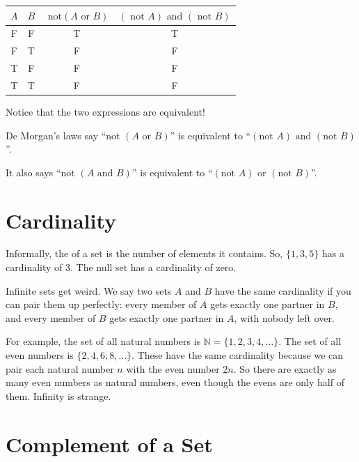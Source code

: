 \begin{Answer}[ref=logic_table]

\begin{tabular}{c | c | c | c}
  $A$ & $B$ & $\text{ not} \left(A \text{ or } B \right)$
  & $\left(\text{ not } A \right) \text{ and } \left(\text{ not } B \right)$ \\
  \hline
  F & F & T & T \\
  F & T & F & F \\
  T & F & F & F \\
  T & T & F & F \\
\end{tabular}

Notice that the two expressions are equivalent!

De Morgan's laws say ``$\text{not } \left(A \text{ or } B \right)$'' is
equivalent to ``$\left(\text{not } A \right) \text{ and } \left(\text{not } B
\right)$''.

It also says ``$\text{not } \left(A \text{ and } B \right)$'' is
equivalent to ``$\left(\text{not } A \right) \text{ or } \left(\text{not } B\right)$''.

\end{Answer}



\section{Cardinality}

Informally, the  of a set is the number of
elements it contains. So, $\{1,3,5\}$ has a cardinality of 3.  The
null set has a cardinality of zero.

Infinite sets get weird. We say two sets $A$ and $B$ have the same cardinality if you can pair them up perfectly: every member of $A$ gets exactly one partner in $B$, and every member of $B$ gets exactly one partner in $A$, with nobody left over.

For example, the set of all natural numbers is $\mathbb{N} = \{1,2,3,4,\dots\}$. The set of all even numbers is $\{2,4,6,8,\dots\}$. These have the same cardinality because we can pair each natural number $n$ with the even number $2n$. So there are exactly as many even numbers as natural numbers, even though the evens are only half of them. Infinity is strange.

\section{Complement of a Set}

